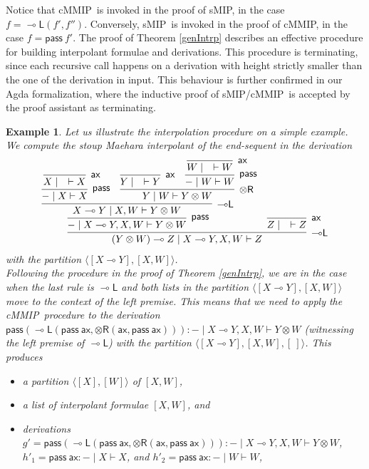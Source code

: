 \documentclass[sn-mathphys-num]{sn-jnl}%
\newcommand{\vd}{\vdash}
\newcommand{\tr}{\otimes\mathsf{R}}
\newcommand{\pass}{\mathsf{pass}}
\newcommand{\ax}{\mathsf{ax}}
\newcommand{\ot}{\otimes}
\newcommand{\lolli}{\multimap}
\newcommand{\lleft}{{\lolli}\mathsf{L}}
\newcommand{\sMIP}{\textsf{sMIP}}
\newcommand{\cMMIP}{\textsf{cMMIP}}
\theoremstyle{thmstyleone}%
\theoremstyle{thmstyletwo}%
\newtheorem{example}[theorem]{Example}%
\theoremstyle{thmstylethree}%
\begin{document}
Notice that \cMMIP~is invoked in the proof of \sMIP, in the case $f = \lleft(f',f'')$.
Conversely,  \sMIP~is invoked in the proof of \cMMIP, in the case $f = \pass \ f'$.
The proof of Theorem \ref{genIntrp} describes an effective procedure for building interpolant formulae and derivations.
This procedure is terminating, since each recursive call happens on a derivation with height strictly smaller than the one of the derivation in input.
This behaviour is further confirmed in our Agda formalization, where the inductive proof of \sMIP/\cMMIP~is accepted by the proof assistant as terminating.

\begin{example}
  Let us illustrate the interpolation procedure on a simple example.
  We compute the stoup Maehara interpolant of the end-sequent in the derivation 
  \begin{equation}\label{example:interpolant}
    \begin{array}{c}
      \infer[\lleft]{(Y \ot W) \lolli Z \mid X \lolli Y , X, W \vd Z}{
      \infer[\pass]{{-} \mid X \lolli Y , X , W\vd Y \ot W}{
      \infer[\lleft]{X \lolli Y \mid X , W \vd Y \ot W}{
      \infer[\pass]{{-} \mid X \vd X}{
      \infer[\ax]{X \mid \quad \vd X}{}
      }
      &
      \infer[\tr]{Y \mid W \vd Y \ot W}{
      \infer[\ax]{Y \mid \quad \vd Y}{}
      &
      \infer[\pass]{{-} \mid W \vd W}{
      \infer[\ax]{W \mid \quad \vd W}{}
      }
      }
      }
      }
      &
      \infer[\ax]{Z \mid \quad \vd Z}{}
      }
    \end{array}
  \end{equation}
  with the partition $\langle [X \lolli Y] , [X, W]\rangle$.
  \\
  Following the procedure in the proof of Theorem \ref{genIntrp}, we are in the case when the last rule is $\lleft$ and both lists in the partition $\langle [X \lolli Y] , [X, W]\rangle$ move to the context of the left premise.
  This means that we need to apply the \cMMIP~procedure to the derivation $\pass (\lleft (\pass \ \ax, \tr (\ax , \pass \ \ax))) : {-} \mid X \lolli Y , X, W \vd Y \ot W$ (witnessing the left premise of $\lleft$) with the partition $\langle [X \lolli Y] , [X, W] , [\ ] \rangle$.
  This produces
  \begin{itemize}
    \item[--] a partition $\langle [X] , [W] \rangle$ of $[X, W]$,
    \item[--] a list of interpolant formulae $[X , W]$, and
    \item[--] derivations $g' = \pass (\lleft (\pass \ \ax, \tr (\ax , \pass \ \ax))) : {-} \mid X \lolli Y , X, W \vd Y \ot W$, $h'_1 = \pass \ \ax : {-} \mid X \vd X$, and $h'_2 = \pass \ \ax : {-} \mid W \vd W$,

\end{itemize}
\end{example}
\end{document}
